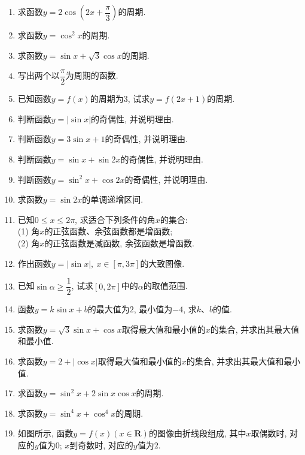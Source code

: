\documentclass[10pt,a4paper]{article}
\begin{document}
\begin{enumerate}[1.]
\item 求函数$y=2\cos (2x+\dfrac{\pi}3)$的周期.
\item 求函数$y=\cos ^2x$的周期.
\item 求函数$y=\sin x+\sqrt 3\cos x$的周期.
\item 写出两个以$\dfrac{\pi}2$为周期的函数.
\item 已知函数$y=f(x)$的周期为$3$, 试求$y=f(2x+1)$的周期.
\item 判断函数$y=|\sin x|$的奇偶性, 并说明理由.
\item 判断函数$y=3\sin x+1$的奇偶性, 并说明理由.
\item 判断函数$y=\sin x+\sin 2x$的奇偶性, 并说明理由.
\item 判断函数$y=\sin ^2x+\cos 2x$的奇偶性, 并说明理由.
\item 求函数$y=\sin 2x$的单调递增区间.
\item 已知$0\le x\le 2\pi$, 求适合下列条件的角$x$的集合:\\
(1) 角$x$的正弦函数、余弦函数都是增函数;\\
(2) 角$x$的正弦函数是减函数, 余弦函数是增函数.
\item 作出函数$y=|\sin x|, \ x\in [\pi ,3\pi]$的大致图像.
\item 已知$\sin \alpha \ge \dfrac 12$, 试求$[0,2\pi]$中的$\alpha$的取值范围.
\item 函数$y=k\sin x+b$的最大值为$2$, 最小值为$-4$, 求$k$、$b$的值.
\item 求函数$y=\sqrt 3\sin x+\cos x$取得最大值和最小值的$x$的集合, 并求出其最大值和最小值.
\item 求函数$y=2+|\cos x|$取得最大值和最小值的$x$的集合, 并求出其最大值和最小值.
\item 求函数$y=\sin ^2x+2\sin x\cos x$的周期.
\item 求函数$y=\sin ^4x+\cos ^4x$的周期.
\item 如图所示, 函数$y=f(x)(x\in \mathbf{R})$的图像由折线段组成, 其中$x$取偶数时, 对应的$y$值为$0$; $x$到奇数时, 对应的$y$值为$2$.
\begin{center}
\end{center}
\end{enumerate}
\end{document}
